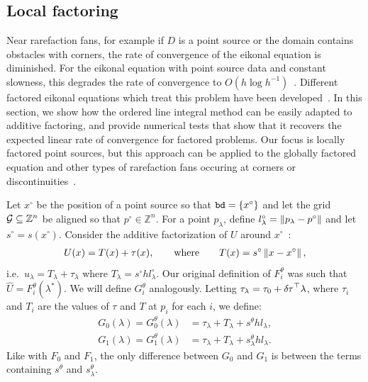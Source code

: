 \documentclass[eikonal.tex]{subfiles}
\begin{document}
\subsection{Local factoring}

Near rarefaction fans, for example if $D$ is a point source or the
domain contains obstacles with corners, the rate of convergence of the
eikonal equation is diminished. For the eikonal equation with point
source data and constant slowness, this degrades the rate of
convergence to $O(h \log h^{-1})$~\cite{qi2018corner}. Different
factored eikonal equations which treat this problem have been
developed~\cite{fomel2009fast,luo2012fast}. In this section, we show
how the ordered line integral method can be easily adapted to additive
factoring, and provide numerical tests that show that it recovers the
expected linear rate of convergence for factored problems. Our focus
is locally factored point sources, but this approach can be applied to
the globally factored equation and other types of rarefaction fans
occuring at corners or discontinuities~\cite{qi2018corner}.

Let $x^\circ$ be the position of a point source so that
$\texttt{bd} = \left\{x^\circ\right\}$ and let the grid
$\mathcal{G} \subseteq \mathbb{Z}^n$ be aligned so that
$p^\circ \in \mathbb{Z}^n$. For a point $p_\lambda$, define
$l^\circ_\lambda = \left\|p_\lambda - p^\circ\right\|$ and let
$s^\circ = s(x^\circ)$. Consider the additive factorization of $U$
around $x^\circ$~\cite{luo2012fast,qi2018corner}:
\begin{align}
  U(x) = T(x) + \tau(x), \qquad \text{where} \qquad T(x) = s^\circ \left\|x - x^\circ\right\|,
\end{align}
i.e.\ $u_\lambda = T_\lambda + \tau_\lambda$ where
$T_\lambda = s^\circ h l^\circ_\lambda$. Our original definition of
$F_i^\theta$ was such that $\hat{U} = F_i^\theta(\lambda^*)$. We will
define $G_i^\theta$ analogously. Letting
$\tau_\lambda = \tau_0 + {\delta \hspace{-0.05em} \tau}^\top \lambda$, where $\tau_i$ and
$T_i$ are the values of $\tau$ and $T$ at $p_i$ for each $i$, we
define:
\begin{align}
  \label{eq:Gi}
  G_0(\lambda) = G_0^\theta(\lambda) &= \tau_\lambda + T_\lambda + s^\theta h l_\lambda, \\
  G_1(\lambda) = G_1^\theta(\lambda) &= \tau_\lambda + T_\lambda + s^\theta_\lambda h l_\lambda.
\end{align}
Like with $F_0$ and $F_1$, the only difference between
$G_0$ and $G_1$ is between the terms containing
$s^\theta$ and $s^\theta_\lambda$.
\end{document}
